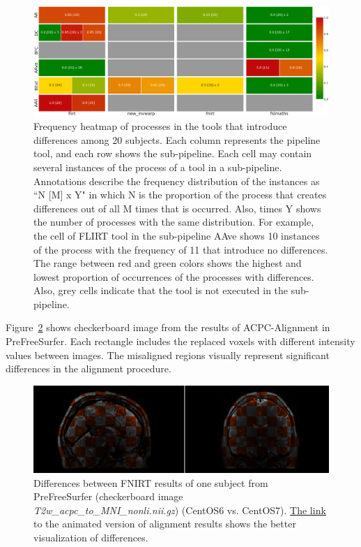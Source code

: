\documentclass[a4paper,num-refs]{oup-contemporary}
\begin{document}
\begin{figure}
\centering
  \includegraphics[width=\textwidth]{images/pfs_heatmap.png}
  \caption{Frequency heatmap of processes in the tools that introduce differences among 20 subjects. 
           Each column represents the pipeline tool, and each row shows the sub-pipeline.
           Each cell may contain several instances of the process of a tool in a sub-pipeline.
           Annotations describe the frequency distribution of the instances as ``N [M] x Y" 
           in which N is the proportion of the process 
           that creates differences out of all M times that is occurred. 
           Also, times Y shows the number of processes with the same distribution.
           For example, the cell of FLIRT tool in the sub-pipeline AAve shows 10 instances of the process 
           with the frequency of 11 that introduce no differences.
           The range between red and green colors shows the highest and lowest 
           proportion of occurrences of the processes with differences.
           Also, grey cells indicate that the tool is not executed in the sub-pipeline.}
  \label{fig:pfs_freq}
\end{figure}


Figure~\ref{fig:fnirt_result} 
shows checkerboard image from the results of ACPC-Alignment in PreFreeSurfer. 
Each rectangle includes the replaced voxels with different intensity values between images.
The misaligned regions visually represent significant differences in the alignment 
procedure.


\begin{figure}
  \centering
    \includegraphics[width=\columnwidth]{images/t2w_alignment.png} 
    \caption{Differences between FNIRT results of one subject from PreFreeSurfer 
    (checkerboard image \emph{T2w\_acpc\_to\_MNI\_nonli.nii.gz}) (CentOS6 vs. 
    CentOS7).
    \href{https://github.com/ali4006/HCP-reproducibility-paper/blob/master/images/pfs_t2w_alignment.gif}
    {The link} to the animated version of alignment results shows the better visualization of differences.
} 
    \label{fig:fnirt_result}
\end{figure}
\end{document}
